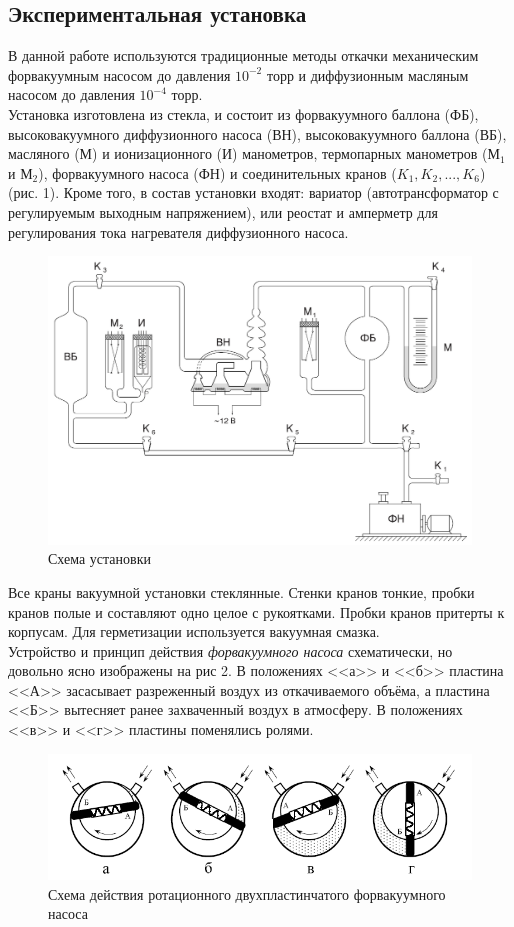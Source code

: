 \documentclass[12pt]{article}
\begin{document}
\subsection*{Экспериментальная установка}
 В данной работе используются традиционные методы откачки механическим форвакуумным насосом до давления $10^{-2}$ торр и диффузионным масляным насосом до давления $10^{-4}$ торр. \\
 	Установка изготовлена из стекла,
 и состоит из форвакуумного баллона (ФБ), высоковакуумного диффузионного насоса (ВН), высоковакуумного баллона (ВБ), масляного (М) и ионизационного (И) манометров, термопарных манометров ($\text{М}_1$ и $\text{М}_2$), форвакуумного насоса (ФН) и соединительных кранов ($K_1, K_2,..., K_6$) (рис. 1). Кроме того, в состав установки входят: вариатор
 (автотрансформатор с регулируемым выходным напряжением), или
 реостат и амперметр для регулирования тока нагревателя диффузионного насоса. \\
  \begin{figure}[!h]
 	\centering
 	\includegraphics[width=0.5\linewidth]{Схема установки.PNG}
 	\caption[]{Схема установки}
 	\label{fig:Схема установки}
 \end{figure}
 Все краны вакуумной установки стеклянные. Стенки кранов тонкие, пробки кранов полые и составляют одно целое с рукоятками. Пробки кранов притерты к корпусам. Для герметизации используется вакуумная смазка. \\
 Устройство и принцип действия \textit{форвакуумного насоса} схематически, но довольно ясно изображены на рис 2. В положениях <<а>> и <<б>> пластина <<А>> засасывает разреженный воздух из откачиваемого объёма, а пластина <<Б>> вытесняет ранее захваченный воздух в атмосферу. В положениях <<в>> и <<г>> пластины поменялись ролями.
\begin{figure}[!h]
	\centering
	\includegraphics[width=0.9\linewidth]{Устройство фв насоса.PNG}
	\caption[]{Схема действия ротационного двухпластинчатого форвакуумного насоса}
	\label{fig:Схема ФВ насоса}
\end{figure}
\end{document}
